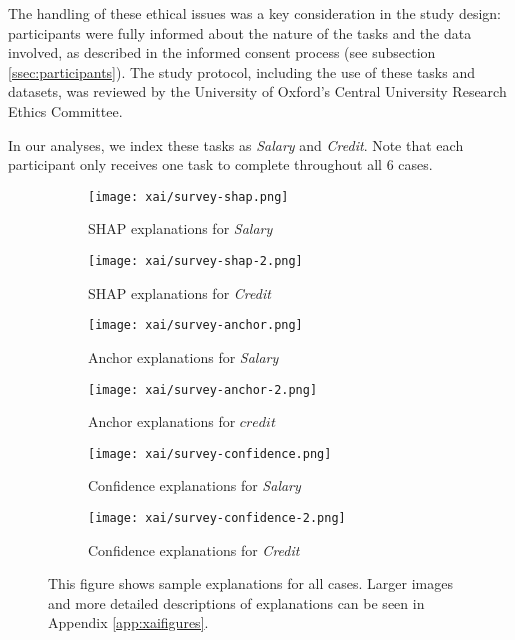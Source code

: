 The handling of these ethical issues was a key consideration in the study design: participants were fully informed about the nature of the tasks and the data involved, as described in the informed consent process (see subsection \ref{ssec:participants}). The study protocol, including the use of these tasks and datasets, was reviewed by the University of Oxford's Central University Research Ethics Committee.

In our analyses, we index these tasks as \emph{Salary} and \emph{Credit}. Note that each participant only receives one task to complete throughout all 6 cases.

\begin{figure}[htbp]
    \centering
    \begin{subfigure}[b]{0.45\textwidth}
        \texttt{[image: xai/survey-shap.png]}
        \caption{SHAP explanations for \emph{Salary}}
        \label{fig:shapsalary}
    \end{subfigure}
    \hfill
    \begin{subfigure}[b]{0.45\textwidth}
        \texttt{[image: xai/survey-shap-2.png]}
        \caption{SHAP explanations for \emph{Credit}}
        \label{fig:shapcredit}
    \end{subfigure}
    \medskip
    \begin{subfigure}[b]{0.45\textwidth}
        \texttt{[image: xai/survey-anchor.png]}
        \caption{Anchor explanations for \emph{Salary}}
        \label{fig:anchorsalary}
    \end{subfigure}
    \hfill
    \begin{subfigure}[b]{0.45\textwidth}
        \texttt{[image: xai/survey-anchor-2.png]}
        \caption{Anchor explanations for $credit$}
        \label{fig:anchorcredit}
    \end{subfigure}
    \medskip
    \begin{subfigure}[b]{0.45\textwidth}
        \texttt{[image: xai/survey-confidence.png]}
        \caption{Confidence explanations for \emph{Salary}}
        \label{fig:confidencesalary}
    \end{subfigure}
    \hfill
    \begin{subfigure}[b]{0.45\textwidth}
        \texttt{[image: xai/survey-confidence-2.png]}
        \caption{Confidence explanations for \emph{Credit}}
        \label{fig:confidencecredit}
    \end{subfigure}
    \caption{This figure shows sample explanations for all cases. Larger images and more detailed descriptions of explanations can be seen in Appendix \ref{app:xaifigures}.}
    \label{fig:online_explanations}
\end{figure}


